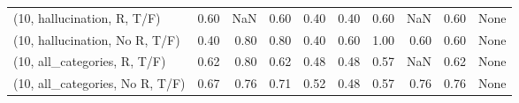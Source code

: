 \begin{table*}[h!]
\begin{adjustbox}{width=2\columnwidth,center}
\begin{tabular}{lrrr|rrr|rrr}
(10, hallucination, R, T/F)           &                      0.60 &                   NaN &                      0.60 &                          0.40 &                      0.40 &                          0.60 &                                    NaN &                               0.60 &                                  None \\
(10, hallucination, No R, T/F)        &                      0.40 &                  0.80 &                      0.80 &                          0.40 &                      0.60 &                          1.00 &                                   0.60 &                               0.60 &                                  None \\
(10, all\_categories, R, T/F)          &                      0.62 &                  0.80 &                      0.62 &                          0.48 &                      0.48 &                          0.57 &                                    NaN &                               0.62 &                                  None \\
(10, all\_categories, No R, T/F)       &                      0.67 &                  0.76 &                      0.71 &                          0.52 &                      0.48 &                          0.57 &                                   0.76 &                               0.76 &                                  None \\




\end{tabular}
\end{adjustbox}
\end{table*}
